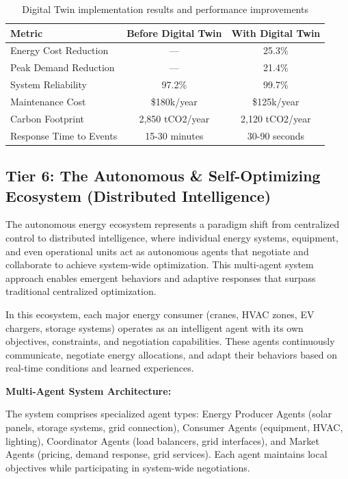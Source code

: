 \documentclass{article}
\begin{document}
\begin{table}[htbp]
\centering
\begin{tabular}{lcc}
\toprule
\textbf{Metric} & \textbf{Before Digital Twin} & \textbf{With Digital Twin} \\
\midrule
Energy Cost Reduction & --- & 25.3\% \\
Peak Demand Reduction & --- & 21.4\% \\
System Reliability & 97.2\% & 99.7\% \\
Maintenance Cost & \$180k/year & \$125k/year \\
Carbon Footprint & 2,850 tCO2/year & 2,120 tCO2/year \\
Response Time to Events & 15-30 minutes & 30-90 seconds \\
\bottomrule
\end{tabular}
\caption{Digital Twin implementation results and performance improvements}
\end{table}

\subsection{Tier 6: The Autonomous \& Self-Optimizing Ecosystem (Distributed Intelligence)}

The autonomous energy ecosystem represents a paradigm shift from centralized control to distributed intelligence, where individual energy systems, equipment, and even operational units act as autonomous agents that negotiate and collaborate to achieve system-wide optimization. This multi-agent system approach enables emergent behaviors and adaptive responses that surpass traditional centralized optimization.

In this ecosystem, each major energy consumer (cranes, HVAC zones, EV chargers, storage systems) operates as an intelligent agent with its own objectives, constraints, and negotiation capabilities. These agents continuously communicate, negotiate energy allocations, and adapt their behaviors based on real-time conditions and learned experiences.

\textbf{Multi-Agent System Architecture:}

The system comprises specialized agent types: Energy Producer Agents (solar panels, storage systems, grid connection), Consumer Agents (equipment, HVAC, lighting), Coordinator Agents (load balancers, grid interfaces), and Market Agents (pricing, demand response, grid services). Each agent maintains local objectives while participating in system-wide negotiations.
\end{document}

